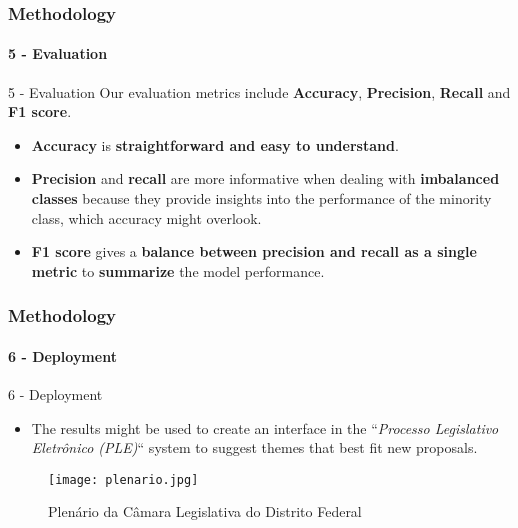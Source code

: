 \begin{frame}
	\frametitle{Methodology}
	\framesubtitle{5 - Evaluation}	
	
	\begin{block}{5 - Evaluation} 
			Our evaluation metrics include \textbf{Accuracy}, \textbf{Precision}, \textbf{Recall} and \textbf{F1 score}.
	\end{block}

	\begin{block}{} 
		\begin{itemize}
			\item \textbf{Accuracy} is \textbf{straightforward and easy to understand}.
			\item \textbf{Precision} and \textbf{recall} are more informative when dealing with \textbf{imbalanced classes} because they provide insights into the performance of the minority class, which accuracy might overlook.
			
			\item \textbf{F1 score} gives a \textbf{balance between precision and recall as a single metric} to \textbf{summarize} the model performance.
		\end{itemize}
	\end{block}
\end{frame}
\begin{frame}
	\frametitle{Methodology}
	\framesubtitle{6 - Deployment}	
	
	\begin{block}{6 - Deployment} 
		\begin{itemize}
			\item The results might be used to create an interface in the ``\textit{Processo Legislativo Eletrônico (PLE)}`` system to suggest themes that best fit new proposals.
		\end{itemize}
	\end{block}

	\begin{figure}
		\texttt{[image: plenario.jpg]}
		\caption{Plenário da Câmara Legislativa do Distrito Federal}
	\end{figure}


\end{frame}
